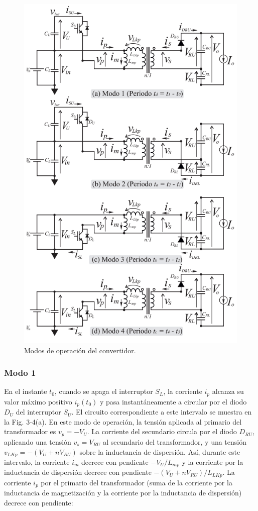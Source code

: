 \begin{figure}
	\centering
	\includegraphics[width=0.7\linewidth]{img/modosOperacion}
	\caption{Modos de operación del convertidor.}
	\label{fig:modosoperacion}
\end{figure}


\subsubsection{Modo 1}

En el instante \( t_0 \), cuando se apaga el interruptor \( S_L \), la corriente \( i_p \) alcanza su valor máximo positivo \( i_p(t_0) \) y pasa instantáneamente a circular por el diodo  \( D_U \) del interruptor \( S_U \). El circuito correspondiente a este intervalo se muestra en la Fig. 3-4(a). En este modo de operación, la tensión aplicada al primario del transformador es \( v_p = -V_U \). La corriente del secundario circula por el diodo \( D_{RU} \), aplicando una tensión \( v_s = V_{RU} \) al secundario del transformador, y una tensión \( v_{LKp} = -(V_U + nV_{RU}) \) sobre la inductancia de dispersión. Así, durante este intervalo, la corriente \( i_m \) decrece con pendiente \( -V_U / L_{mp} \) y la corriente por la inductancia de dispersión decrece con pendiente \( -(V_U + nV_{RU}) / L_{LKp} \). La corriente \( i_p \) por el primario del transformador (suma de la corriente por la inductancia de magnetización y la corriente por la inductancia de dispersión) decrece con pendiente:


